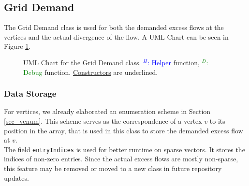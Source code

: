 \subsection{Grid Demand}
The Grid Demand class is used for both the demanded excess flows at the vertices and the actual divergence of the flow. A UML Chart can be seen in Figure \ref{class_demand}.
\begin{figure}
\caption{UML Chart for the Grid Demand class. \textcolor{blue}{$ ^H$: Helper} function, \textcolor{Green}{$ ^D$: Debug} function. \underline{Constructors} are underlined.}\label{class_demand}
\end{figure}

\subsubsection{Data Storage}
For vertices, we already elaborated an enumeration scheme in Section \ref{sec_venum}. This scheme serves as the correspondence of a vertex $v$ to its position in the array, that is used in this class to store the demanded excess flow at $v$.\\
The field \texttt{entryIndices} is used for better runtime on sparse vectors. It stores the indices of non-zero entries. Since the actual excess flows are mostly non-sparse, this feature may be removed or moved to a new class in future repository updates.

